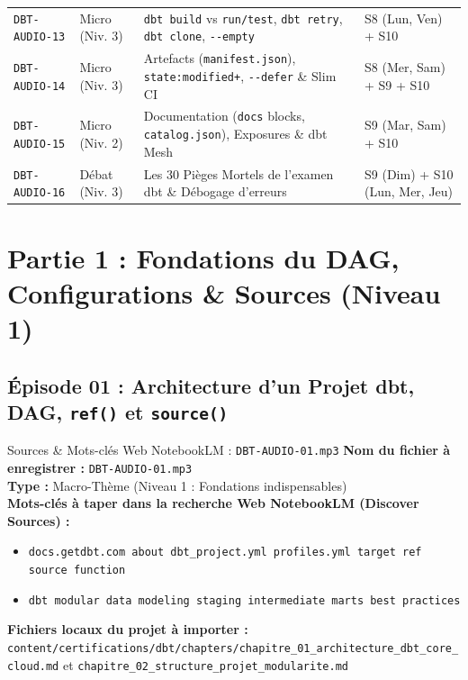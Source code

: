 \documentclass[11pt,a4paper]{article}
\newcommand{\flag}[1]{\texttt{-{}-#1}}
\begin{document}
\begin{table}[h!]
\begin{tabularx}{\textwidth}{l l X l}
\texttt{DBT-AUDIO-13} & Micro (Niv. 3) & \texttt{dbt build} vs \texttt{run/test}, \texttt{dbt retry}, \texttt{dbt clone}, \flag{empty} & S8 (Lun, Ven) + S10 \\
\texttt{DBT-AUDIO-14} & Micro (Niv. 3) & Artefacts (\texttt{manifest.json}), \texttt{state:modified+}, \flag{defer} \& Slim CI & S8 (Mer, Sam) + S9 + S10 \\
\texttt{DBT-AUDIO-15} & Micro (Niv. 2) & Documentation (\texttt{docs} blocks, \texttt{catalog.json}), Exposures \& dbt Mesh & S9 (Mar, Sam) + S10 \\
\texttt{DBT-AUDIO-16} & Débat (Niv. 3) & Les 30 Pièges Mortels de l'examen dbt \& Débogage d'erreurs & S9 (Dim) + S10 (Lun, Mer, Jeu) \\
\bottomrule
\end{tabularx}
\end{table}

\newpage

\section{Partie 1 : Fondations du DAG, Configurations \& Sources (Niveau 1)}

\subsection{Épisode 01 : Architecture d'un Projet dbt, DAG, \texttt{ref()} et \texttt{source()}}
\begin{sourcebox}{Sources \& Mots-clés Web NotebookLM : \texttt{DBT-AUDIO-01.mp3}}
\textbf{Nom du fichier à enregistrer :} \texttt{DBT-AUDIO-01.mp3}\\
\textbf{Type :} Macro-Thème (Niveau 1 : Fondations indispensables)\\
\textbf{Mots-clés à taper dans la recherche Web NotebookLM (Discover Sources) :}
\begin{itemize}[noitemsep]
    \item \texttt{docs.getdbt.com about dbt_project.yml profiles.yml target ref source function}
    \item \texttt{dbt modular data modeling staging intermediate marts best practices}
\end{itemize}
\textbf{Fichiers locaux du projet à importer :}
\texttt{content/certifications/dbt/chapters/chapitre_01_architecture_dbt_core_cloud.md} et \texttt{chapitre_02_structure_projet_modularite.md}
\end{sourcebox}
\end{document}

